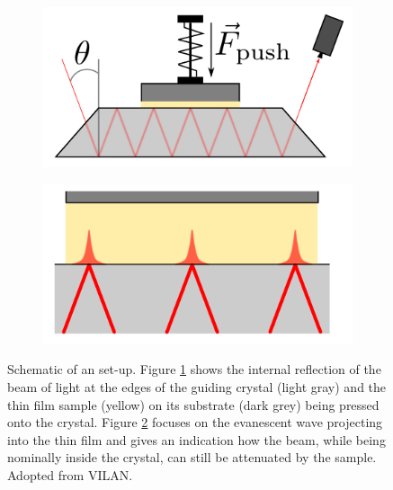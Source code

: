 \begin{figure}
\begin{subfigure}{0.5\textwidth}
\centering
	\includegraphics[width=0.8\linewidth]{./figs/chap1/IRoverview}
	\caption{}
	\label{fig:iroverview}
\end{subfigure}
\begin{subfigure}{0.5\textwidth}
\centering
	\includegraphics[width=0.8\linewidth]{./figs/chap1/IRwave}
	\caption{}
	\label{fig:irwave}
\end{subfigure}
\caption[Schematic of an \atr{} \ftir{} set-up. Figure \ref{fig:iroverview} shows the internal reflection of the beam of light at the edges of the guiding crystal (light gray) and the thin film sample (yellow) on its substrate (dark grey) being pressed onto the crystal. Figure \ref{fig:irwave} focuses on the evanescent wave projecting into the thin film and gives an indication how the beam, while being nominally inside the crystal, can still be attenuated by the sample.]{Schematic of an \atr{} \ftir{} set-up. Figure \ref{fig:iroverview} shows the internal reflection of the beam of light at the edges of the guiding crystal (light gray) and the thin film sample (yellow) on its substrate (dark grey) being pressed onto the crystal. Figure \ref{fig:irwave} focuses on the evanescent wave projecting into the thin film and gives an indication how the beam, while being nominally inside the crystal, can still be attenuated by the sample. Adopted from VILAN.}
\label{fig:irscheme}
\end{figure}
